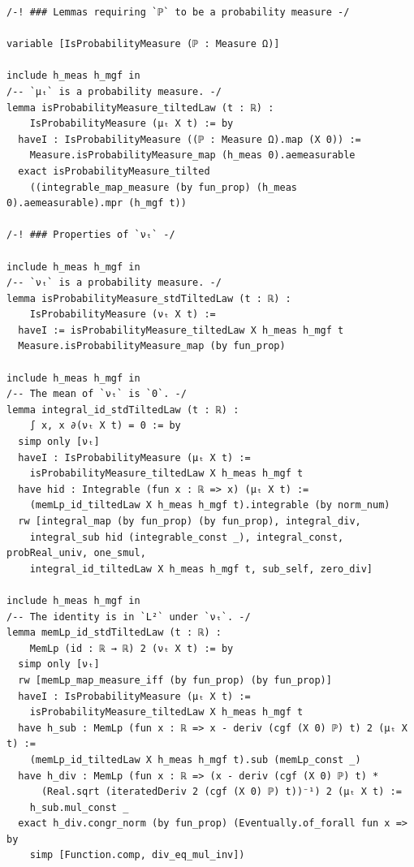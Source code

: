 \newpage
\begin{lstlisting}
/-! ### Lemmas requiring `ℙ` to be a probability measure -/

variable [IsProbabilityMeasure (ℙ : Measure Ω)]

include h_meas h_mgf in
/-- `μₜ` is a probability measure. -/
lemma isProbabilityMeasure_tiltedLaw (t : ℝ) :
    IsProbabilityMeasure (μₜ X t) := by
  haveI : IsProbabilityMeasure ((ℙ : Measure Ω).map (X 0)) :=
    Measure.isProbabilityMeasure_map (h_meas 0).aemeasurable
  exact isProbabilityMeasure_tilted
    ((integrable_map_measure (by fun_prop) (h_meas 0).aemeasurable).mpr (h_mgf t))

/-! ### Properties of `νₜ` -/

include h_meas h_mgf in
/-- `νₜ` is a probability measure. -/
lemma isProbabilityMeasure_stdTiltedLaw (t : ℝ) :
    IsProbabilityMeasure (νₜ X t) :=
  haveI := isProbabilityMeasure_tiltedLaw X h_meas h_mgf t
  Measure.isProbabilityMeasure_map (by fun_prop)

include h_meas h_mgf in
/-- The mean of `νₜ` is `0`. -/
lemma integral_id_stdTiltedLaw (t : ℝ) :
    ∫ x, x ∂(νₜ X t) = 0 := by
  simp only [νₜ]
  haveI : IsProbabilityMeasure (μₜ X t) :=
    isProbabilityMeasure_tiltedLaw X h_meas h_mgf t
  have hid : Integrable (fun x : ℝ => x) (μₜ X t) :=
    (memLp_id_tiltedLaw X h_meas h_mgf t).integrable (by norm_num)
  rw [integral_map (by fun_prop) (by fun_prop), integral_div,
    integral_sub hid (integrable_const _), integral_const, probReal_univ, one_smul,
    integral_id_tiltedLaw X h_meas h_mgf t, sub_self, zero_div]

include h_meas h_mgf in
/-- The identity is in `L²` under `νₜ`. -/
lemma memLp_id_stdTiltedLaw (t : ℝ) :
    MemLp (id : ℝ → ℝ) 2 (νₜ X t) := by
  simp only [νₜ]
  rw [memLp_map_measure_iff (by fun_prop) (by fun_prop)]
  haveI : IsProbabilityMeasure (μₜ X t) :=
    isProbabilityMeasure_tiltedLaw X h_meas h_mgf t
  have h_sub : MemLp (fun x : ℝ => x - deriv (cgf (X 0) ℙ) t) 2 (μₜ X t) :=
    (memLp_id_tiltedLaw X h_meas h_mgf t).sub (memLp_const _)
  have h_div : MemLp (fun x : ℝ => (x - deriv (cgf (X 0) ℙ) t) *
      (Real.sqrt (iteratedDeriv 2 (cgf (X 0) ℙ) t))⁻¹) 2 (μₜ X t) :=
    h_sub.mul_const _
  exact h_div.congr_norm (by fun_prop) (Eventually.of_forall fun x => by
    simp [Function.comp, div_eq_mul_inv])

\end{lstlisting}
\newpage
